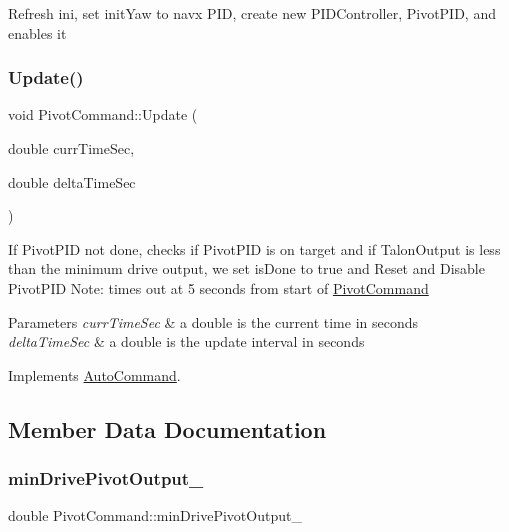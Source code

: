 Refresh ini, set init\+Yaw to navx P\+ID, create new P\+I\+D\+Controller, Pivot\+P\+ID, and enables it \mbox{\label{class_pivot_command_ab43066cd70a708f342f53f94558acf98}} 
\subsubsection{\texorpdfstring{Update()}{Update()}}
{\footnotesize\ttfamily void Pivot\+Command\+::\+Update (\begin{DoxyParamCaption}\item[{double}]{curr\+Time\+Sec,  }\item[{double}]{delta\+Time\+Sec }\end{DoxyParamCaption})\hspace{0.3cm}{\ttfamily [virtual]}}

If Pivot\+P\+ID not done, checks if Pivot\+P\+ID is on target and if Talon\+Output is less than the minimum drive output, we set is\+Done to true and Reset and Disable Pivot\+P\+ID Note\+: times out at 5 seconds from start of \hyperlink{class_pivot_command}{Pivot\+Command} 
\begin{DoxyParams}{Parameters}
{\em curr\+Time\+Sec} & a double is the current time in seconds \\
\hline
{\em delta\+Time\+Sec} & a double is the update interval in seconds \\
\hline
\end{DoxyParams}


Implements \hyperlink{class_auto_command}{Auto\+Command}.



\subsection{Member Data Documentation}
\mbox{\label{class_pivot_command_aa0b7e3b621788df09e8f2cc3c184b858}} 
\subsubsection{\texorpdfstring{min\+Drive\+Pivot\+Output\+\_\+}{minDrivePivotOutput\_}}
{\footnotesize\ttfamily double Pivot\+Command\+::min\+Drive\+Pivot\+Output\+\_\+\hspace{0.3cm}{\ttfamily [private]}}

